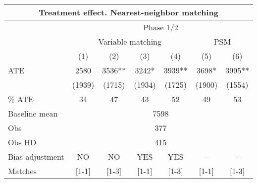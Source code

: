 \begin{tabular}{lcccc|cc}
\toprule
\multicolumn{7}{c}{Treatment effect. Nearest-neighbor matching} \\
\midrule
\midrule
      & \multicolumn{6}{c}{Phase 1/2} \\
\midrule
\midrule
      & \multicolumn{4}{c|}{Variable matching} & \multicolumn{2}{c}{PSM} \\
\midrule
\midrule
      & (1)   & (2)   & (3)   & (4)   & (5)   & (6) \\
\midrule
ATE   & 2580  & 3536** & 3242* & 3939** & 3698* & 3995** \\
      & (1939) & (1715) & (1934) & (1725) & (1900) & (1554) \\
\% ATE & 34    & 47    & 43    & 52    & 49    & 53 \\
Baseline mean & \multicolumn{6}{c}{7598} \\
Obs   & \multicolumn{6}{c}{377} \\
Obs HD & \multicolumn{6}{c}{415} \\
Bias adjustment & NO    & NO    & YES   & YES   & -     & - \\
Matches & [1-1] & [1-3] & [1-1] & [1-3] & [1-1] & [1-3] \\
\bottomrule
\bottomrule
\end{tabular}%
